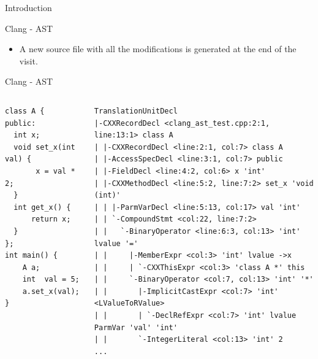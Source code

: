 \documentclass[xcolor=dvipsnames]{beamer}
\begin{document}
\begin{section}{Introduction}
\begin{frame}{\hskip 0.3cm Clang - AST}
\begin{itemize}
\item A new source file with all the modifications is generated at the end of the visit.

\end{itemize}

\end{frame}











\begin{frame}[fragile]{\hskip 0.3cm Clang - AST}

\begin{columns}

\begin{column}{4cm}
\begin{lstlisting}[language=CCC]
class A {
public:
  int x;
  void set_x(int val) {
       x = val * 2;
  }	
  int get_x() {
      return x;
  }
};
int main() {
    A a;
    int  val = 5;
    a.set_x(val);
}
\end{lstlisting}
\end{column}

\begin{column}{7.3cm}

\begin{lstlisting}[language=AST]
TranslationUnitDecl
|-CXXRecordDecl <clang_ast_test.cpp:2:1, line:13:1> class A
| |-CXXRecordDecl <line:2:1, col:7> class A
| |-AccessSpecDecl <line:3:1, col:7> public
| |-FieldDecl <line:4:2, col:6> x 'int'
| |-CXXMethodDecl <line:5:2, line:7:2> set_x 'void (int)'
| | |-ParmVarDecl <line:5:13, col:17> val 'int'
| | `-CompoundStmt <col:22, line:7:2>
| |   `-BinaryOperator <line:6:3, col:13> 'int' lvalue '='
| |     |-MemberExpr <col:3> 'int' lvalue ->x
| |     | `-CXXThisExpr <col:3> 'class A *' this
| |     `-BinaryOperator <col:7, col:13> 'int' '*'
| |       |-ImplicitCastExpr <col:7> 'int' <LValueToRValue>
| |       | `-DeclRefExpr <col:7> 'int' lvalue ParmVar 'val' 'int'
| |       `-IntegerLiteral <col:13> 'int' 2
...
\end{lstlisting}
\end{column}

\end{columns}


\end{frame}








\end{section}
\end{document}
